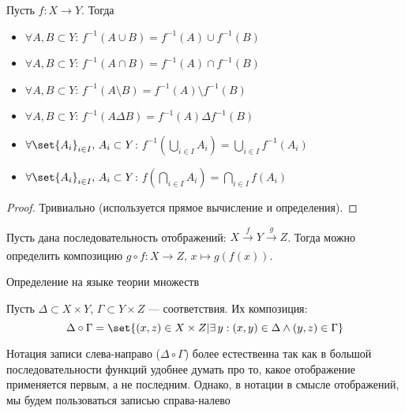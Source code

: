 \documentclass{article}
\begin{document}
\begin{proposition}
    \label{prop:preimage-properties}
    Пусть \(f: X \rightarrow Y\). Тогда 
    \begin{itemize}
        \item \(\forall A, B \subset Y\): \(f^{-1}(A \cup B) = f^{-1}(A) \cup f^{-1}(B)\)
        \item \(\forall A, B \subset Y\): \(f^{-1}(A \cap B) = f^{-1}(A) \cap f^{-1}(B)\)
        \item \(\forall A, B \subset Y\): \(f^{-1}(A \setminus B) = f^{-1}(A) \setminus f^{-1}(B)\)
        \item \(\forall A, B \subset Y\): \(f^{-1}(A \Delta B) = f^{-1}(A) \Delta f^{-1}(B)\)
        \item \(\forall \set{A_i}_{i \in I},\, A_i \subset Y\):  \(f^{-1}(\bigcup_{i \in I} A_i) = \bigcup_{i \in I} f^{-1}(A_i)\)
        \item \(\forall \set{A_i}_{i \in  I},\, A_i \subset Y\):  \(f(\bigcap_{i \in I} A_i) = \bigcap_{i \in  I} f(A_i)\)
    \end{itemize}
\end{proposition}
\begin{proof}
    Тривиально (используется прямое вычисление и определения).
\end{proof}

\begin{definition}
    \label{def:comp-map}
    Пусть дана последовательность отображений: \(X \xrightarrow[]{f} Y \xrightarrow[]{g} Z\). Тогда можно определить композицию \(g \circ f: X \rightarrow Z,\, x \mapsto g(f(x))\). 
\end{definition}

Определение на языке теории множеств
\begin{definition}
    \label{def:comp-rel}
    Пусть \(\Delta \subset X \times Y\), \(\Gamma \subset Y \times Z\) --- соответствия. Их композиция: \[\Delta \circ \Gamma = \set{(x, z) \in X \times Z | \exists\, y: (x, y) \in \Delta \land (y, z) \in \Gamma}\]
\end{definition}
\begin{remark}
    \label{rem:notation}
    Нотация записи слева-направо (\(\Delta \circ \Gamma\)) более естественна так как в большой последовательности функций удобнее думать про то, какое отображение применяется первым, а не последним. Однако, в нотации в смысле отображений, мы будем пользоваться записью справа-налево
\end{remark}
\end{document}

